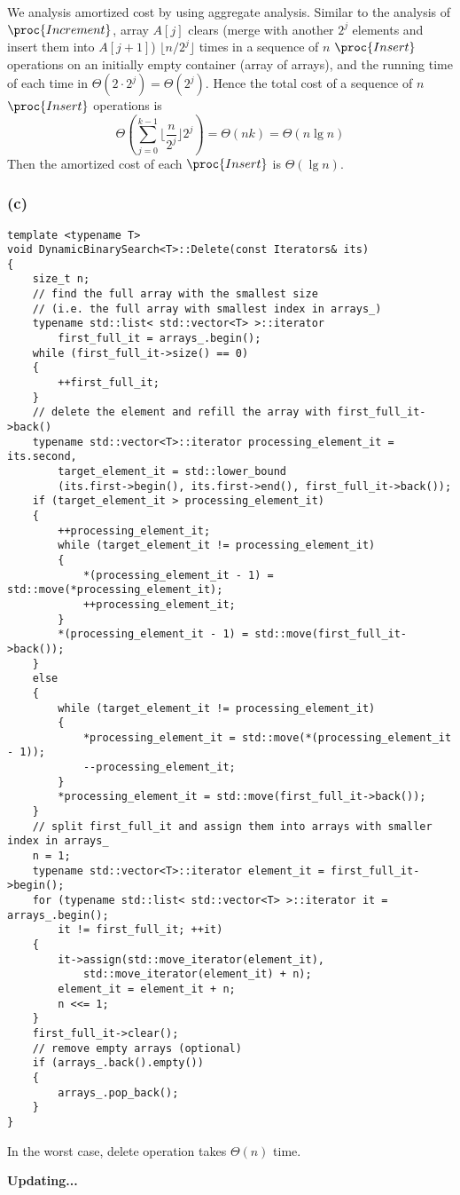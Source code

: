 We analysis amortized cost by using aggregate analysis.
Similar to the analysis of $\proc{Increment}$,
array $A[j]$ clears (merge with another $2^j$ elements 
and insert them into $A[j+1]$) 
$\lfloor n / 2^j \rfloor$ times
in a sequence of $n$ $\proc{Insert}$ operations on an initially
empty container (array of arrays),
and the running time of each time in $\Theta(2 \cdot 2^j) = \Theta(2^j)$.
Hence the total cost of a sequence of $n$ $\proc{Insert}$ operations is
\begin{equation*}
    \Theta(\sum\limits_{j = 0}^{k - 1} \lfloor \frac{n}{2^j} \rfloor 2^j)
    = \Theta(n k) = \Theta(n \lg n)
\end{equation*}
Then the amortized cost of each $\proc{Insert}$ is $\Theta(\lg n)$.

\subsubsection*{(c)}

\begin{verbatim}
template <typename T>
void DynamicBinarySearch<T>::Delete(const Iterators& its)
{
    size_t n;
    // find the full array with the smallest size 
    // (i.e. the full array with smallest index in arrays_)
    typename std::list< std::vector<T> >::iterator 
        first_full_it = arrays_.begin();
    while (first_full_it->size() == 0)
    {
        ++first_full_it;
    }
    // delete the element and refill the array with first_full_it->back()
    typename std::vector<T>::iterator processing_element_it = its.second,
        target_element_it = std::lower_bound
        (its.first->begin(), its.first->end(), first_full_it->back());
    if (target_element_it > processing_element_it)
    {
        ++processing_element_it;
        while (target_element_it != processing_element_it)
        {
            *(processing_element_it - 1) = std::move(*processing_element_it);
            ++processing_element_it;
        }
        *(processing_element_it - 1) = std::move(first_full_it->back());
    }
    else
    {
        while (target_element_it != processing_element_it)
        {
            *processing_element_it = std::move(*(processing_element_it - 1));
            --processing_element_it;
        }
        *processing_element_it = std::move(first_full_it->back());
    }
    // split first_full_it and assign them into arrays with smaller index in arrays_
    n = 1;
    typename std::vector<T>::iterator element_it = first_full_it->begin();
    for (typename std::list< std::vector<T> >::iterator it = arrays_.begin();
        it != first_full_it; ++it)
    {
        it->assign(std::move_iterator(element_it), 
            std::move_iterator(element_it) + n);
        element_it = element_it + n;
        n <<= 1;
    }
    first_full_it->clear();
    // remove empty arrays (optional)
    if (arrays_.back().empty())
    {
        arrays_.pop_back();
    }
}
\end{verbatim}

In the worst case, delete operation takes $\Theta(n)$ time.

\centerline{\textbf{Updating...}}

